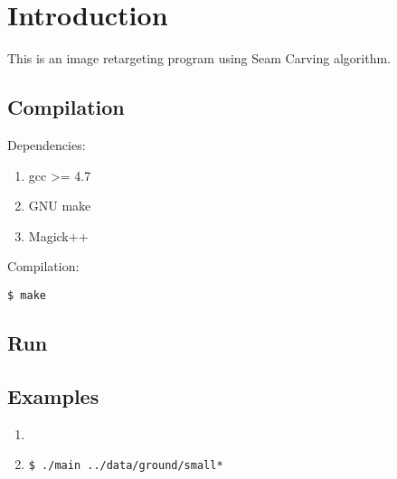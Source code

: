 \section{Introduction}
This is an image retargeting program using Seam Carving\cite{sc} algorithm.

\subsection{Compilation}
Dependencies:

\begin{enumerate}
    \item gcc >= 4.7
    \item GNU make
    \item Magick++
\end{enumerate}

Compilation:
\begin{lstlisting}
$ make
\end{lstlisting}

\subsection{Run}

\subsection{Examples}
\begin{enumerate}
\item


  \item
    \begin{lstlisting}
$ ./main ../data/ground/small*
    \end{lstlisting}
\end{enumerate}
